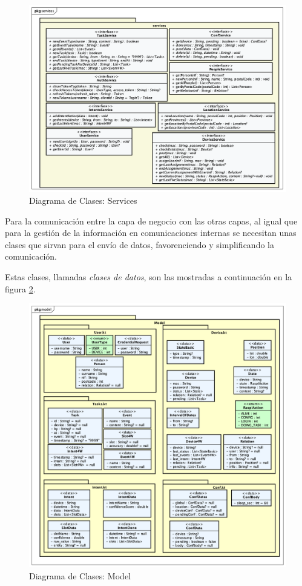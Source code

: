     \begin{figure}[H]
        \centering
        \includegraphics[width=14cm]{./img/arch/back/dc.services.png}
        \caption{Diagrama de Clases: Services}
        \label{fig:dc.services}
    \end{figure}

    Para la comunicación entre la capa de negocio con las otras capas, al igual que para la gestión de la información en comunicaciones internas se necesitan unas clases que sirvan para el envío de datos, favorenciendo y simplificando la comunicación.
    
    Estas clases, llamadas \textit{clases de datos}, son las mostradas a continuación en la figura \ref{fig:dc.model}.

    \begin{figure}[H]
        \centering
        \includegraphics[width=14cm]{./img/arch/back/dc.model.png}
        \caption{Diagrama de Clases: Model}
        \label{fig:dc.model}
    \end{figure}


